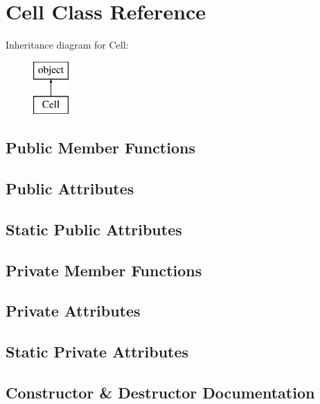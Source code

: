 \hypertarget{classopenbu_1_1cell_1_1_cell}{}\section{Cell Class Reference}
\label{classopenbu_1_1cell_1_1_cell}
Inheritance diagram for Cell\+:\begin{figure}[H]
\begin{center}
\leavevmode
\includegraphics[height=2.000000cm]{classopenbu_1_1cell_1_1_cell}
\end{center}
\end{figure}
\subsection*{Public Member Functions}
\subsection*{Public Attributes}
\subsection*{Static Public Attributes}
\subsection*{Private Member Functions}
\subsection*{Private Attributes}
\subsection*{Static Private Attributes}


\subsection{Constructor \& Destructor Documentation}
\mbox{\label{classopenbu_1_1cell_1_1_cell_ab6fab37f53eb047dc026a676a9b67fda}} 
